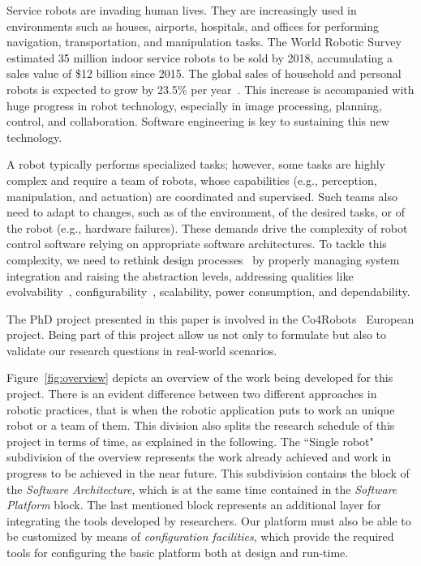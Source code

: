 Service robots are invading human lives. They are increasingly used in environments such as houses, airports, hospitals, and offices for performing navigation, transportation, and manipulation tasks. 
The World Robotic Survey~\cite{wrs:online} estimated 35 million indoor service robots to be sold by 2018, accumulating a sales value of \$12 billion since 2015. 
The global sales of household and personal robots is expected to grow by 23.5\% per year~\cite{sheng:online}. 
This increase is accompanied with huge progress in robot technology, especially in image processing, planning, control, and collaboration. Software engineering is key to sustaining this new technology.

A robot typically performs specialized tasks; however, some tasks are highly complex and require a team of robots, whose capabilities (e.g., perception, manipulation, and actuation) are coordinated and supervised. 
Such teams also need to adapt to changes, such as of the environment, of the desired tasks, or of the robot (e.g., hardware failures). 
These demands drive the complexity of robot control software relying on appropriate software architectures. 
To tackle this complexity, we need to rethink design processes~\cite{Lee2008} by properly managing system integration and raising the abstraction levels, addressing qualities like evolvability~\cite{Perez2008}, configurability~\cite{Gamez2013563}, scalability, power consumption, and dependability.

The PhD project presented in this paper is involved in the Co4Robots~\cite{co4robots} European project.
Being part of this project allow us not only to formulate but also to validate our research questions in real-world scenarios.

Figure~\ref{fig:overview} depicts an overview of the work being developed for this project.
There is an evident difference between two different approaches in robotic practices, that is when the robotic application puts to work an unique robot or a team of them. 
This division also splits the research schedule of this project in terms of time, as explained in the following.
The ``Single robot" subdivision of the overview represents the work already achieved and work in progress to be achieved in the near future.
This subdivision contains the block of the \emph{Software Architecture}, which is at the same time contained in the \emph{Software Platform} block.
The last mentioned block represents an additional layer for integrating the tools developed by researchers.
Our platform must also be able to be customized by means of \emph{configuration facilities}, which provide the required tools for configuring the basic platform both at design and run-time.

